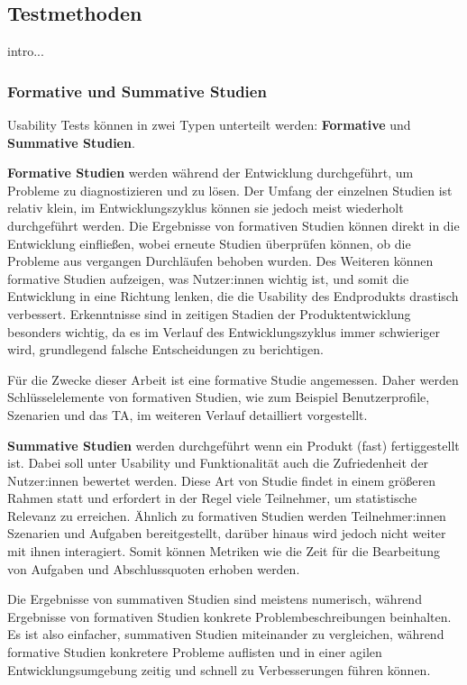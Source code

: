 
\subsection{Testmethoden}
intro...
\subsubsection{Formative und Summative Studien}
\label{section:formative-summative}
Usability Tests können in zwei Typen unterteilt werden: \textbf{Formative} und \textbf{Summative
Studien}.

\textbf{Formative Studien} werden während der Entwicklung durchgeführt, um Probleme zu
diagnostizieren und zu lösen. Der Umfang der einzelnen Studien ist relativ klein, im
Entwicklungszyklus können sie jedoch meist wiederholt durchgeführt werden. Die Ergebnisse von
formativen Studien können direkt in die Entwicklung einfließen, wobei erneute Studien überprüfen
können, ob die Probleme aus vergangen Durchläufen behoben wurden. Des Weiteren können formative
Studien aufzeigen, was Nutzer:innen wichtig ist, und somit die Entwicklung in eine Richtung lenken,
die die Usability des Endprodukts drastisch verbessert. Erkenntnisse sind in zeitigen Stadien der
Produktentwicklung besonders wichtig, da es im Verlauf des Entwicklungszyklus immer schwieriger
wird, grundlegend falsche Entscheidungen zu berichtigen.

Für die Zwecke dieser Arbeit ist eine formative Studie angemessen. Daher werden Schlüsselelemente
von formativen Studien, wie zum Beispiel Benutzerprofile, Szenarien und das \acl{TA}, im weiteren
Verlauf detailliert vorgestellt.

\textbf{Summative Studien} werden durchgeführt wenn ein Produkt (fast) fertiggestellt ist. Dabei
soll unter Usability und Funktionalität auch die Zufriedenheit der Nutzer:innen bewertet werden.
Diese Art von Studie findet in einem größeren Rahmen statt und erfordert in der Regel viele
Teilnehmer, um statistische Relevanz zu erreichen. Ähnlich zu formativen Studien werden
Teilnehmer:innen Szenarien und Aufgaben bereitgestellt, darüber hinaus wird jedoch nicht weiter mit
ihnen interagiert. Somit können Metriken wie die Zeit für die Bearbeitung von Aufgaben und
Abschlussquoten erhoben werden.

Die Ergebnisse von summativen Studien sind meistens numerisch, während Ergebnisse von formativen
Studien konkrete Problembeschreibungen beinhalten. Es ist also einfacher, summativen Studien
miteinander zu vergleichen, während formative Studien konkretere Probleme auflisten und in einer
agilen Entwicklungsumgebung zeitig und schnell zu Verbesserungen führen können.

